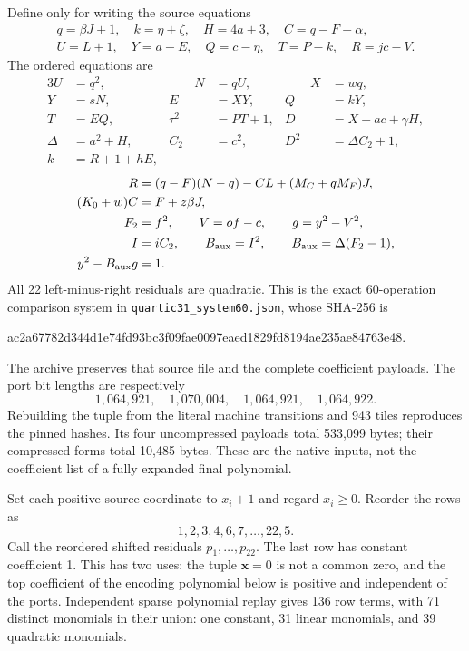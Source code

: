 \documentclass[11pt]{article}
\theoremstyle{definition}\newtheorem{definition}[theorem]{Definition}
\begin{document}
Define only for writing the source equations
\[
\begin{gathered}
q=\beta J+1,\quad k=\eta+\zeta,\quad H=4a+3,\quad C=q-F-\alpha,\\
U=L+1,\quad Y=a-E,\quad Q=c-\eta,\quad T=P-k,\quad R=jc-V.
\end{gathered}
\]
The ordered equations are
\begin{alignat*}{3}
 U&=q^2, &\qquad N&=qU, &\qquad X&=wq,\\
 Y&=sN, & E&=XY, & Q&=kY,\\
 T&=EQ, & \tau^2&=PT+1, & D&=X+ac+\gamma H,\\
 \Delta&=a^2+H, & C_2&=c^2, & D^2&=\Delta C_2+1,\\
 k&=R+1+hE,&&&&
\end{alignat*}
\begin{align*}
R&=(q-F)(N-q)-CL+(M_C+qM_F)J,\\
(K_0+w)C&=F+z\beta J,\\
F_2&=f^2,\qquad V=of-c,\qquad g=y^2-V^2,\\
I&=iC_2,\qquad B_{\rm aux}=I^2,\qquad
B_{\rm aux}=\Delta(F_2-1),\\
y^2-B_{\rm aux}g&=1.
\end{align*}
All 22 left-minus-right residuals are quadratic. This is the exact
60-operation comparison system in
\texttt{quartic31\_system60.json}, whose SHA-256 is
\begin{center}\footnotesize\ttfamily
ac2a67782d344d1e74fd93bc3f09fae0097eaed1829fd8194ae235ae84763e48.
\end{center}
The archive preserves that source file and the complete coefficient
payloads. The port bit lengths are respectively
\[
 1,064,921,\quad1,070,004,\quad1,064,921,\quad1,064,922.
\]
Rebuilding the tuple from the literal machine transitions and 943 tiles
reproduces the pinned hashes. Its four uncompressed payloads total
533,099 bytes; their compressed forms total 10,485 bytes.
These are the native inputs, not the coefficient list of a fully
expanded final polynomial.

Set each positive source coordinate to $x_i+1$ and regard $x_i\geq0$.
Reorder the rows as
\[
 1,2,3,4,6,7,\ldots,22,5.
\]
Call the reordered shifted residuals $p_1,\ldots,p_{22}$.
The last row has constant coefficient 1. This has two uses: the tuple
$\boldsymbol{x}=0$ is not a common zero, and the top coefficient of
the encoding polynomial below is positive and independent of the ports.
Independent sparse polynomial replay gives 136 row terms, with 71
distinct monomials in their union: one constant, 31 linear monomials,
and 39 quadratic monomials.
\end{document}
